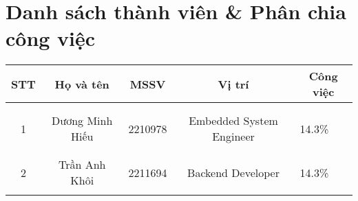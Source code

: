 \section{Danh sách thành viên \& Phân chia công việc}
\renewcommand{\arraystretch}{1.4}
\begin{table}[H]
\begin{tabular}{|c|c|c|c|p{4cm}|}
\hline
\rowcolor[HTML]{EFEFEF} 
\textbf{STT}        & \textbf{Họ và tên}                        & \textbf{MSSV}                     & \textbf{Vị trí}                                           & \multicolumn{1}{c|}{\cellcolor[HTML]{EFEFEF}\textbf{Công việc}}   \\ \hline
                    &                                           &                                   &                                                           &                                                                   \\ \cline{5-5} 
                    &                                           &                                   &                                                           &                                                                   \\ \cline{5-5} 
\multirow{-3}{*}{1} & \multirow{-3}{*}{Dương Minh Hiếu}         & \multirow{-3}{*}{2210978}         & \multirow{-3}{3cm}{\centering Embedded System Engineer}   & \multirow{-3}{3cm}{14.3\%}                                        \\ \hline
                    &                                           &                                   &                                                           &                                                                   \\ \cline{5-5} 
                    &                                           &                                   &                                                           &                                                                   \\ \cline{5-5} 
\multirow{-3}{*}{2} & \multirow{-3}{*}{Trần Anh Khôi}           & \multirow{-3}{*}{2211694}         & \multirow{-3}{3cm}{\centering Backend Developer}          & \multirow{-3}{3cm}{14.3\%}                                        \\ \hline
                    &                                           &                                   &                                                           &                                                                   \\ \cline{5-5} 

\end{tabular}
\end{table}
